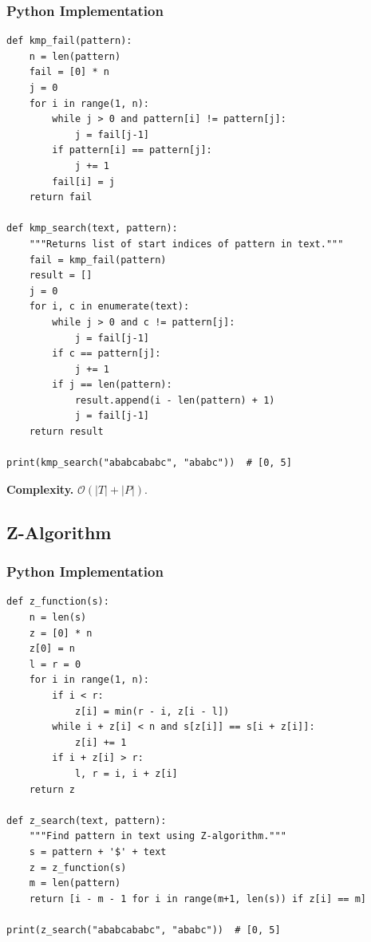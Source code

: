 \documentclass[10pt,a4paper]{article}
\theoremstyle{cpstyle}
\newcommand{\bigO}[1]{\mathcal{O}\!\left(#1\right)}
\begin{document}
\subsubsection{Python Implementation}
\begin{lstlisting}[caption={KMP -- failure function and pattern matching}]
def kmp_fail(pattern):
    n = len(pattern)
    fail = [0] * n
    j = 0
    for i in range(1, n):
        while j > 0 and pattern[i] != pattern[j]:
            j = fail[j-1]
        if pattern[i] == pattern[j]:
            j += 1
        fail[i] = j
    return fail

def kmp_search(text, pattern):
    """Returns list of start indices of pattern in text."""
    fail = kmp_fail(pattern)
    result = []
    j = 0
    for i, c in enumerate(text):
        while j > 0 and c != pattern[j]:
            j = fail[j-1]
        if c == pattern[j]:
            j += 1
        if j == len(pattern):
            result.append(i - len(pattern) + 1)
            j = fail[j-1]
    return result

print(kmp_search("ababcababc", "ababc"))  # [0, 5]
\end{lstlisting}

\textbf{Complexity.} $\bigO{|T|+|P|}$.

\subsection{Z-Algorithm}

\subsubsection{Python Implementation}
\begin{lstlisting}[caption={Z-Function -- z[i] = longest match of s[i:] with prefix}]
def z_function(s):
    n = len(s)
    z = [0] * n
    z[0] = n
    l = r = 0
    for i in range(1, n):
        if i < r:
            z[i] = min(r - i, z[i - l])
        while i + z[i] < n and s[z[i]] == s[i + z[i]]:
            z[i] += 1
        if i + z[i] > r:
            l, r = i, i + z[i]
    return z

def z_search(text, pattern):
    """Find pattern in text using Z-algorithm."""
    s = pattern + '$' + text
    z = z_function(s)
    m = len(pattern)
    return [i - m - 1 for i in range(m+1, len(s)) if z[i] == m]

print(z_search("ababcababc", "ababc"))  # [0, 5]
\end{lstlisting}
\end{document}
